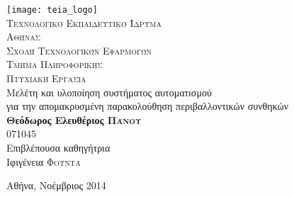 
\begin{titlepage}

\begin{center}

\texttt{[image: teia\_logo]}\\[0.3cm]
\textsc{\LARGE Τεχνολογικό Εκπαιδευτικό Ίδρυμα\\Αθήνασ}\\[2em]

\textsc{\Large Σχολή Τεχνολογικών Εφαρμογών}\\
\textsc{\LARGE Τμήμα Πληροφορικήσ}\\[3em]

\textsc{Πτυχιακή Εργασία}\\[-0.5cm]
{\LARGE\textsf{Μελέτη και υλοποίηση συστήματος αυτοματισμού\\
για την απομακρυσμένη παρακολούθηση περιβαλλοντικών συνθηκών}}\\[1cm]

{\bfseries Θεόδωρος Ελευθέριος \textsc{Πάνου}}\\[-0.1cm]
071045\\[1cm]

Επιβλέπουσα καθηγήτρια\\[-0.1cm]
Ιφιγένεια \textsc{Φουντά}
\\[5cm]

\vfill

\large{Αθήνα, Νοέμβριος 2014}

\end{center}

\end{titlepage}
